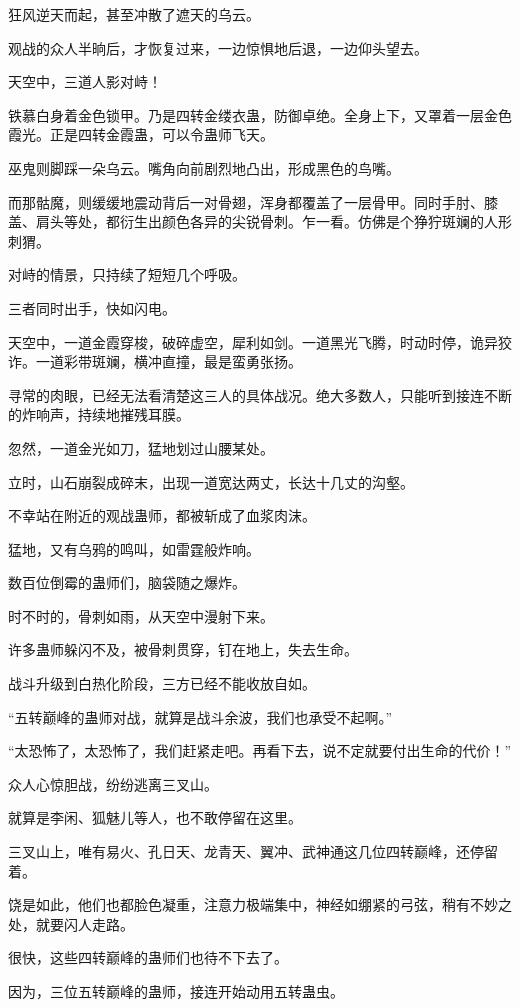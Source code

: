 \begin{this_body}
狂风逆天而起，甚至冲散了遮天的乌云。

观战的众人半晌后，才恢复过来，一边惊惧地后退，一边仰头望去。

天空中，三道人影对峙！

铁慕白身着金色锁甲。乃是四转金缕衣蛊，防御卓绝。全身上下，又罩着一层金色霞光。正是四转金霞蛊，可以令蛊师飞天。

巫鬼则脚踩一朵乌云。嘴角向前剧烈地凸出，形成黑色的鸟嘴。

而那骷魔，则缓缓地震动背后一对骨翅，浑身都覆盖了一层骨甲。同时手肘、膝盖、肩头等处，都衍生出颜色各异的尖锐骨刺。乍一看。仿佛是个狰狞斑斓的人形刺猬。

对峙的情景，只持续了短短几个呼吸。

三者同时出手，快如闪电。

天空中，一道金霞穿梭，破碎虚空，犀利如剑。一道黑光飞腾，时动时停，诡异狡诈。一道彩带斑斓，横冲直撞，最是蛮勇张扬。

寻常的肉眼，已经无法看清楚这三人的具体战况。绝大多数人，只能听到接连不断的炸响声，持续地摧残耳膜。

忽然，一道金光如刀，猛地划过山腰某处。

立时，山石崩裂成碎末，出现一道宽达两丈，长达十几丈的沟壑。

不幸站在附近的观战蛊师，都被斩成了血浆肉沫。

猛地，又有乌鸦的鸣叫，如雷霆般炸响。

数百位倒霉的蛊师们，脑袋随之爆炸。

时不时的，骨刺如雨，从天空中漫射下来。

许多蛊师躲闪不及，被骨刺贯穿，钉在地上，失去生命。

战斗升级到白热化阶段，三方已经不能收放自如。

“五转巅峰的蛊师对战，就算是战斗余波，我们也承受不起啊。”

“太恐怖了，太恐怖了，我们赶紧走吧。再看下去，说不定就要付出生命的代价！”

众人心惊胆战，纷纷逃离三叉山。

就算是李闲、狐魅儿等人，也不敢停留在这里。

三叉山上，唯有易火、孔日天、龙青天、翼冲、武神通这几位四转巅峰，还停留着。

饶是如此，他们也都脸色凝重，注意力极端集中，神经如绷紧的弓弦，稍有不妙之处，就要闪人走路。

很快，这些四转巅峰的蛊师们也待不下去了。

因为，三位五转巅峰的蛊师，接连开始动用五转蛊虫。


\end{this_body}
